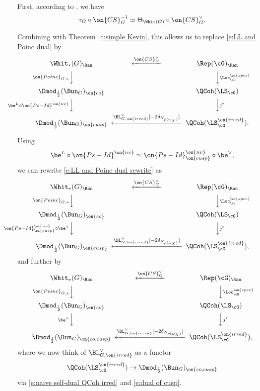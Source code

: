 \documentclass[9pt]{amsart}
\theoremstyle{remark}
\theoremstyle{definition}
\theoremstyle{remark}
\newcommand{\thmref}[1]{Theorem~\ref{#1}}
\numberwithin{equation}{section}
\begin{document}
\medskip

First, according to \cite[Lemma 1.4.12]{GLC2}, we have
$$\tau_G\circ \on{CS}^{-1}_G\simeq \Theta_{\Whit(G)}\circ \on{CS}_G^\vee.$$

Combining with \thmref{t:simple Kevin}, this allows us to replace \eqref{e:LL and Poinc dual} by
\begin{equation} \label{e:LL and Poinc dual rewrite}
\CD
\Whit_*(G)_\Ran @<{\on{CS}^\vee_G}<<  \Rep(\cG)_\Ran \\
@V{\on{Poinc}_{G,*}}VV @VV{\Loc^{\on{spec}}_\cG}V \\
\Dmod_{\frac{1}{2}}(\Bun_G)_{\on{co}} & & \QCoh(\LS_\cG) \\
@V{\be^L \circ \on{Ps-Id}^{\on{nv}}}VV @VV{\jmath^*}V  \\
\Dmod_{\frac{1}{2}}(\Bun_G)_{\on{cusp}} @<{\BL^\vee_{G,\on{irred}}[-2\delta_{N_{\rho(\omega_X)}}]}<< \QCoh(\LS^{\on{irred}}_\cG).
\endCD
\end{equation} 

\sssec{}

Using 
$$\be^L\circ \on{Ps-Id}^{\on{nv}} \simeq  \on{Ps-Id}^{\on{nv}}_{\on{cusp}} \circ \be^\vee,$$
we can rewrite \eqref{e:LL and Poinc dual rewrite} as 
$$
\CD
\Whit_*(G)_\Ran @<{\on{CS}^\vee_G}<<  \Rep(\cG)_\Ran \\
@V{\on{Poinc}_{G,*}}VV @VV{\Loc^{\on{spec}}_\cG}V \\
\Dmod_{\frac{1}{2}}(\Bun_G)_{\on{co}} & & \QCoh(\LS_\cG) \\
@V{\on{Ps-Id}^{\on{nv}}_{\on{cusp}} \circ \be^\vee}VV @VV{\jmath^*}V  \\
\Dmod_{\frac{1}{2}}(\Bun_G)_{\on{cusp}} @<{\BL^\vee_{G,\on{irred}}[-2\delta_{N_{\rho(\omega_X)}}]}<< \QCoh(\LS^{\on{irred}}_\cG),
\endCD
$$
and further by
\begin{equation} \label{e:LL and Poinc dual rewrite again}
\CD
\Whit_*(G)_\Ran @<{\on{CS}^\vee_G}<<  \Rep(\cG)_\Ran \\
@V{\on{Poinc}_{G,*}}VV @VV{\Loc^{\on{spec}}_\cG}V \\
\Dmod_{\frac{1}{2}}(\Bun_G)_{\on{co}} & & \QCoh(\LS_\cG) \\
@V{\be^\vee}VV @VV{\jmath^*}V  \\
\Dmod_{\frac{1}{2}}(\Bun_G)_{\on{co,cusp}} @<{\BL^\vee_{G,\on{irred}}[-2\delta_{N_{\rho(\omega_X)}}]}<< \QCoh(\LS^{\on{irred}}_\cG),
\endCD
\end{equation} 
where we now think of $\BL^\vee_{G,\on{irred}}$ as a functor
$$\QCoh(\LS^{\on{irred}}_\cG)\to \Dmod_{\frac{1}{2}}(\Bun_G)_{\on{co,cusp}}$$
via \eqref{e:naive self-dual QCoh irred} and \eqref{e:dual of cusp}. 
\end{document}
